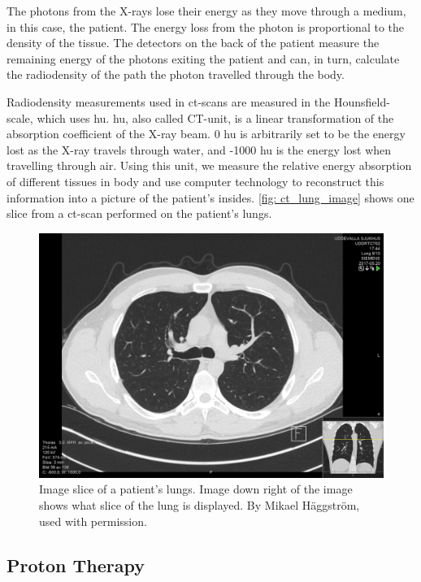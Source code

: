\documentclass[main.tex]{subfiles}
\begin{document}
The photons from the X-rays lose their energy as they move through a medium, in this case, the patient. The energy loss from the photon is proportional to the density of the tissue. The detectors on the back of the patient measure the remaining energy of the photons exiting the patient and can, in turn, calculate the radiodensity of the path the photon travelled through the body.

Radiodensity measurements used in \gls{ct}-scans are measured in the Hounsfield-scale, which uses \gls{hu}. \gls{hu}, also called CT-unit, is a linear transformation of the absorption coefficient of the X-ray beam. 0 \gls{hu} is arbitrarily set to be the energy lost as the X-ray travels through water, and -1000 \gls{hu} is the energy lost when travelling through air. Using this unit, we measure the relative energy absorption of different tissues in body and use computer technology to reconstruct this information into a picture of the patient's insides. \autoref{fig: ct_lung_image} shows one slice from a \gls{ct}-scan performed on the patient's lungs.


 \begin{figure}[!htpb]
    \centering
    \includegraphics[width=12cm ]{images/High-resolution_computed_tomograph_of_a_normal_thorax,_axial_plane_(38).jpg}
    \caption{Image slice of a patient's lungs. Image down right of the image shows what slice of the lung is displayed. By Mikael Häggström, used with permission.}
    \label{fig: ct_lung_image}
\end{figure}
\FloatBarrier 


\subsection{Proton Therapy}
\end{document}
